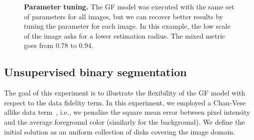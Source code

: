 \documentclass[smallextended]{svjour3}
\begin{document}
\begin{figure}
\center
{}\hspace{1em}
\caption{\textbf{Parameter tuning.} The GF model was executed with the same set of parameters for all images, but we can recover better results by tuning the parameter for each image. In this example, the low scale of the image asks for a lower estimation radius. The mixed metric goes from $0.78$ to $0.94$. }
\label{fig:coco-parameter-tuning}
\end{figure}
%
%
\subsection{Unsupervised binary segmentation}
The goal of this experiment is to illustrate the flexibility of the GF model with respect to the data fidelity term. In this experiment, we employed a Chan-Vese allike data term~\cite{chan01}, i.e., we penalize the square mean error between pixel intensity and the average foreground color (similarly for the background). We define the initial solution as an uniform collection of disks covering the image domain.
\end{document}
